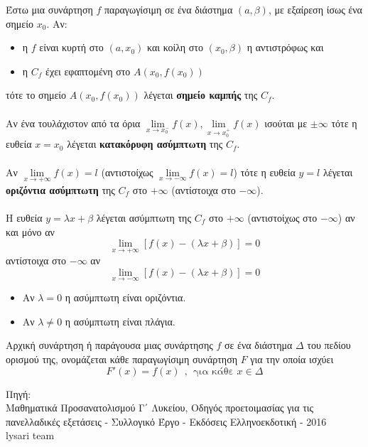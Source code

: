 \documentclass[ektypwsh]{frontisthrio}
\newcommand{\en}[1]{{\selectlanguage{english}#1\selectlanguage{greek}}}
\begin{document}
Έστω μια συνάρτηση $ f $ παραγωγίσιμη σε ένα διάστημα $ (a,\beta) $, με εξαίρεση ίσως ένα σημείο $ x_0 $. Αν:
\begin{itemize}[itemsep=0mm]
\item η $ f $ είναι κυρτή στο $ (a,x_0) $ και κοίλη στο $ (x_0,\beta) $ η αντιστρόφως και
\item η $ C_f $ έχει εφαπτομένη στο $ A(x_0,f(x_0)) $
\end{itemize}
τότε το σημείο $ A(x_0,f(x_0)) $ λέγεται \textbf{σημείο καμπής} της $ C_f $.\\\\
Αν ένα τουλάχιστον από τα όρια $ \lim\limits_{x\to x_0^-}{f(x)},\lim\limits_{x\to x_0^+}{f(x)} $ ισούται με $ \pm\infty $ τότε η ευθεία $ x=x_0 $ λέγεται \textbf{κατακόρυφη ασύμπτωτη} της $ C_f $.\\\\
Αν $ \lim\limits_{x\to +\infty}{f(x)}=l $ (αντιστοίχως $ \lim\limits_{x\to -\infty}{f(x)}=l $) τότε η ευθεία $ y=l $ λέγεται \textbf{οριζόντια ασύμπτωτη} της $ C_f $ στο $ +\infty $ (αντίστοιχα στο $ -\infty $).\\\\
Η ευθεία $ y=\lambda x+\beta $ λέγεται ασύμπτωτη της $ C_f $ στο $ +\infty $ (αντιστοίχως στο $ -\infty $) αν και μόνο αν
\[ \lim\limits_{x\to +\infty}{[f(x)-(\lambda x+\beta)]=0} \]
αντίστοιχα στο $ -\infty $ αν 
\[ \lim_{x\to -\infty}{[f(x)-(\lambda x+\beta)]=0} \]
\begin{itemize}[itemsep=0mm]
\item Αν $ \lambda=0 $ η ασύμπτωτη είναι οριζόντια.
\item Αν $ \lambda\neq 0 $ η ασύμπτωτη είναι πλάγια.
\end{itemize}
Αρχική συνάρτηση ή παράγουσα μιας συνάρτησης $f$ σε ένα διάστημα $\varDelta$ του πεδίου ορισμού της, ονομάζεται κάθε παραγωγίσιμη συνάρτηση $F$ για την οποία ισχύει
\[ F'(x)=f(x)\ \ ,\ \ \text{για κάθε }x\in\varDelta \]
\vfill
\begin{flushright}
\begin{minipage}{7.2cm}
{\small Πηγή:\\
Μαθηματικά Προσανατολισμού Γ΄ Λυκείου, Οδηγός προετοιμασίας για τις πανελλαδικές εξετάσεις - Συλλογικό Έργο - Εκδόσεις Ελληνοεκδοτική - 2016\\\en{lysari team}}
\end{minipage}
\end{flushright}
\end{document}
